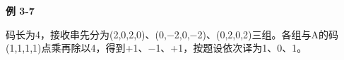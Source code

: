{\color{ink}\bfseries 例 3-7}\par\vspace{1bp}码长为4，接收串先分为(2,\allowbreak{}0,\allowbreak{}2,\allowbreak{}0)、(0,\allowbreak{}\(-\)2,\allowbreak{}0,\allowbreak{}\(-\)2)、(0,\allowbreak{}2,\allowbreak{}0,\allowbreak{}2)三组。各组与A的码(1,\allowbreak{}1,\allowbreak{}1,\allowbreak{}1)点乘再除以4，得到+\allowbreak{}1、\(-\)1、+\allowbreak{}1，按题设依次译为1、0、1。
